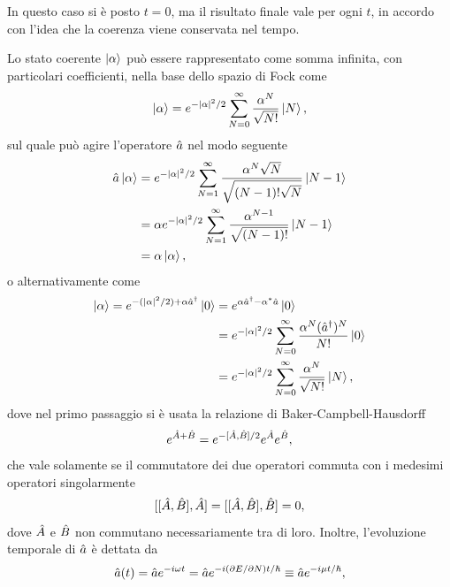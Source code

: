 \begin{obs}
    In questo caso si è posto $t = 0$, ma il risultato finale vale per ogni $t$, in accordo con l'idea che la coerenza viene conservata nel tempo.
\end{obs}
Lo stato coerente $\ket{\alpha}$ può essere rappresentato come somma infinita, con particolari coefficienti, nella base dello spazio di Fock come
\begin{equation}
    \ket{\alpha} = e^{-|\alpha|^2/2}\sum_{N=0}^\infty\frac{\alpha^N}{\sqrt{N!}}\ket{N},
\end{equation}
sul quale può agire l'operatore $\hat{a}$ nel modo seguente
\begin{equation}
    \begin{split}
        \hat{a}\ket{\alpha} &= e^{-|\alpha|^2/2}\sum_{N=1}^\infty\frac{\alpha^N\sqrt{N}}{\sqrt{(N - 1)!\sqrt{N}}}\ket{N - 1} \\
        &= \alpha e^{-|\alpha|^2/2}\sum_{N=1}^\infty\frac{\alpha^{N - 1}}{\sqrt{(N - 1)!}}\ket{N - 1} \\
        &= \alpha\ket{\alpha},
    \end{split}
\end{equation}
o alternativamente come
\begin{equation}
    \begin{split}
        \ket{\alpha} = e^{-(|\alpha|^2/2) + \alpha\hat{a}^\dagger}\ket{0} &=  e^{\alpha\hat{a}^\dagger - \alpha^*\hat{a}}\ket{0} \\
        &= e^{-|\alpha|^2/2}\sum_{N=0}^\infty\frac{\alpha^N(\hat{a}^\dagger)^N}{N!}\ket{0} \\
        &= e^{-|\alpha|^2/2}\sum_{N=0}^\infty\frac{\alpha^N}{\sqrt{N!}}\ket{N},
    \end{split}
\end{equation}
dove nel primo passaggio si è usata la relazione di Baker-Campbell-Hausdorff
\begin{equation}
    e^{\hat{A} + \hat{B}} = e^{-[\hat{A},\hat{B}]/2}e^{\hat{A}} e^{\hat{B}},
\end{equation}
che vale solamente se il commutatore dei due operatori commuta con i medesimi operatori singolarmente
\begin{equation}
    [[\hat{A},\hat{B}],\hat{A}] = [[\hat{A},\hat{B}],\hat{B}] = 0,
\end{equation}
dove $\hat{A}$ e $\hat{B}$ non commutano necessariamente tra di loro. Inoltre, l'evoluzione temporale di $\hat{a}$ è dettata da
\begin{equation}
    \hat{a}(t) = \hat{a} e^{-i\omega t} = \hat{a} e^{-i(\partial E/\partial N)t/\hbar} \equiv \hat{a} e^{-i\mu t/\hbar},
\end{equation}

